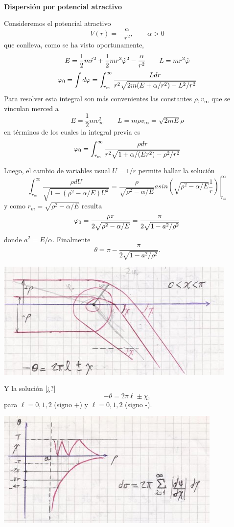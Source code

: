 \documentclass[10pt,oneside]{CBFT_book}
\begin{document}
\begin{ejemplo}{\bf Dispersión por potencial atractivo}
 
Consideremos el potencial atractivo
\[
	V(r) = - \frac{\alpha}{r^2}, \qquad \alpha > 0
\]
que conlleva, como se ha visto oportunamente,
\[
	E = \frac{1}{2} m \dot{r}^2 +  \frac{1}{2} m r^2 \dot{ \varphi }^2 - \frac{\alpha}{r^2}
	\qquad L = m r^2 \dot{ \varphi }
\]
\[
	\varphi_0 = \int d\varphi =
	\int_{r_m}^\infty \frac{ L dr }{ r^2 \sqrt{ 2 m ( E + \alpha / r^2 ) - L^2 / r^2 } }
\] 
Para resolver esta integral son más convenientes las constantes $\rho,v_\infty$ que se vinculan merced
a
\[
	E = \frac{1}{2} m v_\infty^2 \qquad L = m \rho v_\infty = \sqrt{2mE} \rho
\]
en términos de los cuales la integral previa es 
\[
	\varphi_0 =
	\int_{r_m}^\infty \frac{ \rho dr }{ r^2 \sqrt{ 1 + \alpha /(E r^2 ) - \rho^2 / r^2 } }
\] 

Luego, el cambio de variables usual $U=1/r$ permite hallar la solución 
\[
	\int_{r_m}^\infty \frac{ \rho dU }{ \sqrt{ 1 - ( \rho^2 - \alpha / E ) U^2 }} =
	\left. \frac{\rho}{\sqrt{ \rho^2 - \alpha/E }}
	asin \left( \sqrt{ \rho^2 - \alpha / E } \frac{1}{r} \right) \right|_{r_m}^\infty
\]
y como $r_m = \sqrt{\rho^2 - \alpha/E}$ resulta 
\[
	\varphi_0 = \frac{ \rho \pi }{ 2 \sqrt{\rho^2 - \alpha/E} } =
	\frac{ \pi }{ 2 \sqrt{ 1 - a^2 / \rho^2 } }
\]
donde $ a^2 = E / \alpha $. Finalmente
\[
	\theta = \pi - \frac{ \pi }{ 2 \sqrt{ 1 - a^2 / \rho^2 } }.
\]

\includegraphics[scale=0.5]{images/fig_mc_dispersion_esquema_pot_atractivo.jpg} 
 
Y la solución [¿?] 
\[
	-\theta = 2 \pi \ell \pm \chi,
\]
para $ \ell = 0, 1, 2 $ (signo +) y $ \ell = 0, 1, 2 $ (signo -).

\includegraphics[scale=0.5]{images/fig_mc_dispersion_esquema_pot_atractivo2.jpg} 
 
\end{ejemplo}
\end{document}

